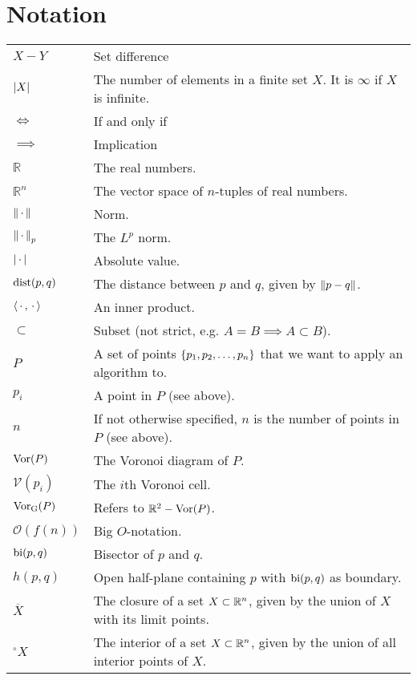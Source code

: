 \chapter{Notation}

\begin{table}[H]
\begin{tabular}{ll}
$X - Y$ & Set difference \\
$\left\lvert X \right\rvert$ & The number of elements in a finite set $X$. It is $\infty$ if $X$ is infinite. \\
$\iff$ & If and only if \\
$\implies$ & Implication \\
$\mathbb{R}$ & The real numbers. \\
$\mathbb{R}^n$ & The vector space of $n$-tuples of real numbers. \\
$\left\lVert \,\cdot\, \right\rVert$ & Norm. \\
$\left\lVert \,\cdot\, \right\rVert_p$ & The $L^p$ norm. \\
$\left\lvert \,\cdot\, \right\rvert$    & Absolute value. \\
$\operatorname{dist}(p, q)$ & The distance between $p$ and $q$, given by $\left\lVert p - q \right\rVert$. \\
$\left\langle \,\cdot\,, \,\cdot\, \right\rangle$ & An inner product. \\
$\subset$    & Subset (not strict, e.g. $A = B \implies A \subset B$). \\
$P$ & A set of points $\{p_1, p_2, \ldots, p_n\}$ that we want to apply an algorithm to. \\
$p_i$ & A point in $P$ (see above). \\
$n$ & If not otherwise specified, $n$ is the number of points in $P$ (see above). \\
$\operatorname{Vor}(P)$    & The Voronoi diagram of $P$. \\
$\mathcal{V}(p_i)$    & The $i$th Voronoi cell. \\
$\operatorname{Vor_{G}}(P)$    & Refers to $\mathbb{R}^2 - \operatorname{Vor}(P)$. \\
$\mathcal{O}(f(n))$ & Big $O$-notation. \\
$\operatorname{bi}(p,q)$    & Bisector of $p$ and $q$. \\
$h(p,q)$    & Open half-plane containing $p$ with $\operatorname{bi}(p,q)$ as boundary. \\
$\overline{X}$ & The closure of a set $X \subset \mathbb{R}^n$, given by the union of $X$ with its limit points. \\
${}^{\circ}X$ & The interior of a set $X \subset \mathbb{R}^n$, given by the union of all interior points of $X$. \\

\end{tabular}
\end{table}
